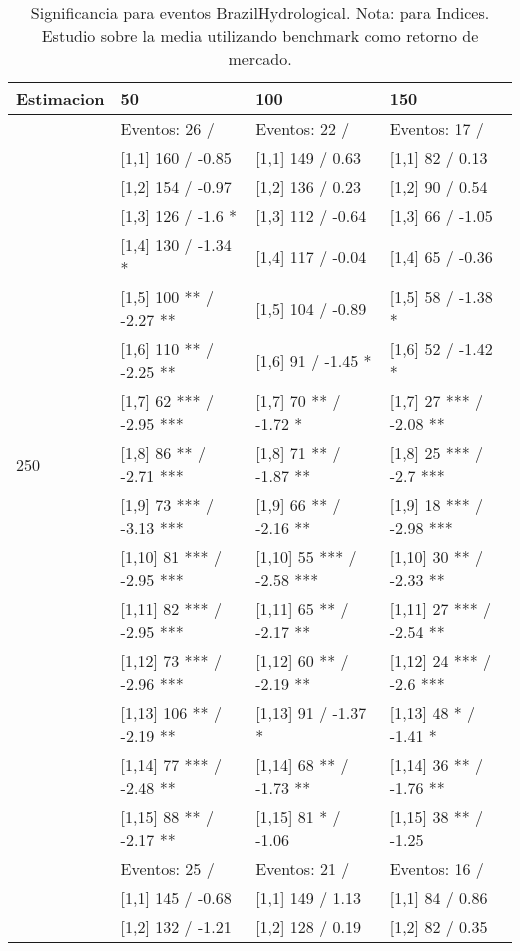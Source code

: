 \begin{table}

\caption{Significancia para eventos BrazilHydrological. Nota: para Indices. Estudio sobre la media utilizando benchmark como retorno de mercado.}
\centering
\begin{tabular}[t]{llll}
\toprule
Estimacion & 50 & 100 & 150\\
\midrule
 & Eventos:  26 / & Eventos:  22 / & Eventos:  17 /\\
 & {}[1,1] 160  / -0.85 & {}[1,1] 149  / 0.63 & {}[1,1] 82  / 0.13\\
 & {}[1,2] 154  / -0.97 & {}[1,2] 136  / 0.23 & {}[1,2] 90  / 0.54\\
 & {}[1,3] 126  / -1.6 * & {}[1,3] 112  / -0.64 & {}[1,3] 66  / -1.05\\
 & {}[1,4] 130  / -1.34 * & {}[1,4] 117  / -0.04 & {}[1,4] 65  / -0.36\\
\addlinespace
 & {}[1,5] 100 ** / -2.27 ** & {}[1,5] 104  / -0.89 & {}[1,5] 58  / -1.38 *\\
 & {}[1,6] 110 ** / -2.25 ** & {}[1,6] 91  / -1.45 * & {}[1,6] 52  / -1.42 *\\
 & {}[1,7] 62 *** / -2.95 *** & {}[1,7] 70 ** / -1.72 * & {}[1,7] 27 *** / -2.08 **\\
250 & {}[1,8] 86 ** / -2.71 *** & {}[1,8] 71 ** / -1.87 ** & {}[1,8] 25 *** / -2.7 ***\\
 & {}[1,9] 73 *** / -3.13 *** & {}[1,9] 66 ** / -2.16 ** & {}[1,9] 18 *** / -2.98 ***\\
\addlinespace
 & {}[1,10] 81 *** / -2.95 *** & {}[1,10] 55 *** / -2.58 *** & {}[1,10] 30 ** / -2.33 **\\
 & {}[1,11] 82 *** / -2.95 *** & {}[1,11] 65 ** / -2.17 ** & {}[1,11] 27 *** / -2.54 **\\
 & {}[1,12] 73 *** / -2.96 *** & {}[1,12] 60 ** / -2.19 ** & {}[1,12] 24 *** / -2.6 ***\\
 & {}[1,13] 106 ** / -2.19 ** & {}[1,13] 91  / -1.37 * & {}[1,13] 48 * / -1.41 *\\
 & {}[1,14] 77 *** / -2.48 ** & {}[1,14] 68 ** / -1.73 ** & {}[1,14] 36 ** / -1.76 **\\
\addlinespace
 & {}[1,15] 88 ** / -2.17 ** & {}[1,15] 81 * / -1.06 & {}[1,15] 38 ** / -1.25\\
 & Eventos:  25 / & Eventos:  21 / & Eventos:  16 /\\
 & {}[1,1] 145  / -0.68 & {}[1,1] 149  / 1.13 & {}[1,1] 84  / 0.86\\
 & {}[1,2] 132  / -1.21 & {}[1,2] 128  / 0.19 & {}[1,2] 82  / 0.35\\

\end{tabular}
\end{table}
